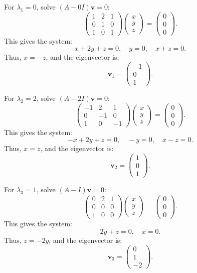 \documentclass[
  letterpaper,
  DIV=11,
  numbers=noendperiod]{scrreprt}
\theoremstyle{plain}
\theoremstyle{definition}
\theoremstyle{remark}
\begin{document}
For \(\lambda_1 = 0\), solve \((A - 0I)\mathbf{v} = 0\): \[
\begin{pmatrix} 1 & 2 & 1 \\ 0 & 1 & 0 \\ 1 & 0 & 1 \end{pmatrix} \begin{pmatrix} x \\ y \\ z \end{pmatrix} = \begin{pmatrix} 0 \\ 0 \\ 0 \end{pmatrix}.
\] This gives the system: \[
x + 2y + z = 0, \quad y = 0, \quad x + z = 0.
\] Thus, \(x = -z\), and the eigenvector is: \[
\mathbf{v}_1 = \begin{pmatrix} -1 \\ 0 \\ 1 \end{pmatrix}.
\]

For \(\lambda_2 = 2\), solve \((A - 2I)\mathbf{v} = 0\): \[
\begin{pmatrix} -1 & 2 & 1 \\ 0 & -1 & 0 \\ 1 & 0 & -1 \end{pmatrix} \begin{pmatrix} x \\ y \\ z \end{pmatrix} = \begin{pmatrix} 0 \\ 0 \\ 0 \end{pmatrix}.
\] This gives the system: \[
-x + 2y + z = 0, \quad -y = 0, \quad x - z = 0.
\] Thus, \(x = z\), and the eigenvector is: \[
\mathbf{v}_2 = \begin{pmatrix} 1 \\ 0 \\ 1 \end{pmatrix}.
\]

For \(\lambda_3 = 1\), solve \((A - I)\mathbf{v} = 0\): \[
\begin{pmatrix} 0 & 2 & 1 \\ 0 & 0 & 0 \\ 1 & 0 & 0 \end{pmatrix} \begin{pmatrix} x \\ y \\ z \end{pmatrix} = \begin{pmatrix} 0 \\ 0 \\ 0 \end{pmatrix}.
\] This gives the system: \[
2y + z = 0, \quad x = 0.
\] Thus, \(z = -2y\), and the eigenvector is: \[
\mathbf{v}_3 = \begin{pmatrix} 0 \\ 1 \\ -2 \end{pmatrix}.
\]
\end{document}
